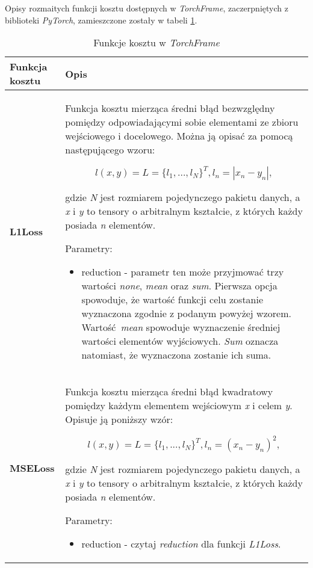 \begin{enumerate}
    Opisy rozmaitych funkcji kosztu dostępnych w \textit{TorchFrame}, zaczerpniętych z biblioteki \textit{PyTorch},
    zamieszczone zostały w tabeli \ref{tab:cost_functions}.
 \begin{small}
    \begin{longtable}{ |m{2cm}|m{11cm}| }
      \caption{Funkcje kosztu w \textit{TorchFrame}}
      \label{tab:cost_functions}
      \endfirsthead
      \endhead
     \hline
       \textbf{Funkcja kosztu} & \textbf{Opis} \\

     \hline
       \textbf{L1Loss} &

       Funkcja kosztu mierząca średni błąd bezwzględny pomiędzy
       odpowiadającymi sobie elementami ze zbioru wejściowego i docelowego.
       Można ją opisać za pomocą następującego wzoru:

       \[l(x,y) = L = \{l_1,...,l_N\}^T, l_n = |x_n - y_n|,\]

       gdzie \textit{N} jest rozmiarem pojedynczego pakietu danych, a \textit{x} i
       \textit{y} to tensory o arbitralnym kształcie, z których każdy posiada
       \textit{n} elementów.

       Parametry:
       \begin{itemize}
       \item reduction - parametr ten może przyjmować trzy wartości \textit{none},
       \textit{mean} oraz \textit{sum}. Pierwsza opcja spowoduje, że wartość funkcji
       celu zostanie wyznaczona zgodnie z podanym powyżej wzorem. Wartość \textit{mean}
       spowoduje wyznaczenie średniej wartości elementów wyjściowych. \textit{Sum}
       oznacza natomiast, że wyznaczona zostanie ich suma.
       \end{itemize} \\

     \hline
       \textbf{MSELoss} &

       Funkcja kosztu mierząca średni błąd kwadratowy pomiędzy każdym elementem
       wejściowym \textit{x} i celem \textit{y}. Opisuje ją poniższy wzór:

       \[l(x,y) = L = \{l_1,...,l_N\}^T, l_n = (x_n - y_n)^2,\]

       gdzie \textit{N} jest rozmiarem pojedynczego pakietu danych, a \textit{x} i
       \textit{y} to tensory o arbitralnym kształcie, z których każdy posiada
       \textit{n} elementów.

       Parametry:
       \begin{itemize}
       \item reduction - czytaj \textit{reduction} dla funkcji \textit{L1Loss}.
       \end{itemize} \\


\end{longtable}
\end{small}
\end{enumerate}
